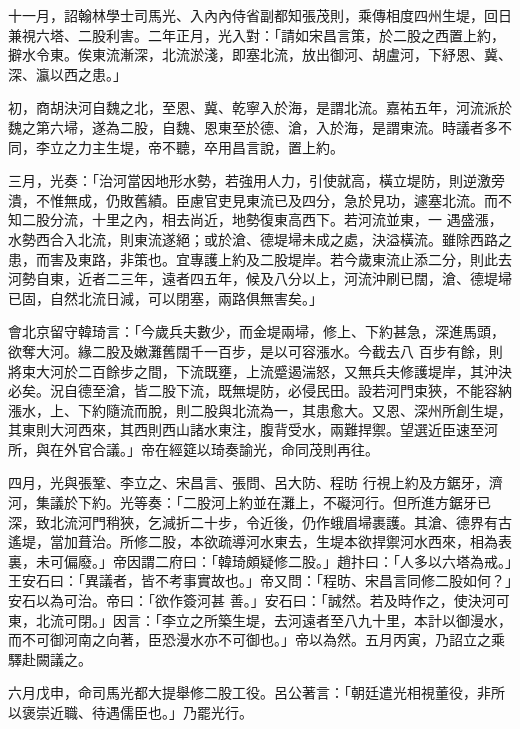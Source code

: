\begin{pinyinscope}
 十一月，詔翰林學士司馬光、入內內侍省副都知張茂則，乘傳相度四州生堤，回日兼視六塔、二股利害。二年正月，光入對：「請如宋昌言策，於二股之西置上約，擗水令東。俟東流漸深，北流淤淺，即塞北流，放出御河、胡盧河，下紓恩、冀、
 深、瀛以西之患。」



 初，商胡決河自魏之北，至恩、冀、乾寧入於海，是謂北流。嘉祐五年，河流派於魏之第六埽，遂為二股，自魏、恩東至於德、滄，入於海，是謂東流。時議者多不同，李立之力主生堤，帝不聽，卒用昌言說，置上約。



 三月，光奏：「治河當因地形水勢，若強用人力，引使就高，橫立堤防，則逆激旁潰，不惟無成，仍敗舊績。臣慮官吏見東流已及四分，急於見功，遽塞北流。而不知二股分流，十里之內，相去尚近，地勢復東高西下。若河流並東，一
 遇盛漲，水勢西合入北流，則東流遂絕；或於滄、德堤埽未成之處，決溢橫流。雖除西路之患，而害及東路，非策也。宜專護上約及二股堤岸。若今歲東流止添二分，則此去河勢自東，近者二三年，遠者四五年，候及八分以上，河流沖刷已闊，滄、德堤埽已固，自然北流日減，可以閉塞，兩路俱無害矣。」



 會北京留守韓琦言：「今歲兵夫數少，而金堤兩埽，修上、下約甚急，深進馬頭，欲奪大河。緣二股及嫩灘舊闊千一百步，是以可容漲水。今截去八
 百步有餘，則將束大河於二百餘步之間，下流既壅，上流蹙遏湍怒，又無兵夫修護堤岸，其沖決必矣。況自德至滄，皆二股下流，既無堤防，必侵民田。設若河門束狹，不能容納漲水，上、下約隨流而脫，則二股與北流為一，其患愈大。又恩、深州所創生堤，其東則大河西來，其西則西山諸水東注，腹背受水，兩難捍禦。望選近臣速至河所，與在外官合議。」帝在經筵以琦奏諭光，命同茂則再往。



 四月，光與張鞏、李立之、宋昌言、張問、呂大防、程昉
 行視上約及方鋸牙，濟河，集議於下約。光等奏：「二股河上約並在灘上，不礙河行。但所進方鋸牙已深，致北流河門稍狹，乞減折二十步，令近後，仍作蛾眉埽裹護。其滄、德界有古遙堤，當加葺治。所修二股，本欲疏導河水東去，生堤本欲捍禦河水西來，相為表裏，未可偏廢。」帝因謂二府曰：「韓琦頗疑修二股。」趙抃曰：「人多以六塔為戒。」王安石曰：「異議者，皆不考事實故也。」帝又問：「程昉、宋昌言同修二股如何？」安石以為可治。帝曰：「欲作簽河甚
 善。」安石曰：「誠然。若及時作之，使決河可東，北流可閉。」因言：「李立之所築生堤，去河遠者至八九十里，本計以御漫水，而不可御河南之向著，臣恐漫水亦不可御也。」帝以為然。五月丙寅，乃詔立之乘驛赴闕議之。



 六月戊申，命司馬光都大提舉修二股工役。呂公著言：「朝廷遣光相視董役，非所以褒崇近職、待遇儒臣也。」乃罷光行。




\end{pinyinscope}
